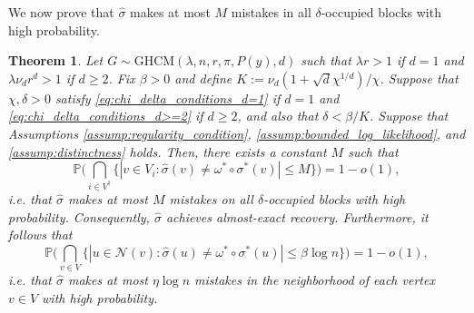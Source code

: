 \documentclass{article}
\renewcommand{\P}{\mathbb{P}}
\newcommand{\1}{\mathbbm{1}}
\newcommand{\calN}{\mathcal{N}}
\theoremstyle{definition}
\theoremstyle{plain}
\newtheorem{theorem}{Theorem}
\begin{document}
We now prove that $\hat{\sigma}$ makes at most $M$ mistakes in all $\delta$-occupied blocks with high probability.

\begin{theorem}
\label{thm:almost_exact_recovery}
Let $G \sim \text{GHCM}(\lambda, n, r, \pi, P(y), d)$ such that $\lambda r > 1$ if $d = 1$ and $\lambda \nu_d r^d > 1$ if $d \geq 2$. Fix $\beta > 0$ and define $K := \nu_d(1 + \sqrt{d}\chi^{1/d})/\chi$. Suppose that $\chi, \delta > 0$ satisfy \eqref{eq:chi_delta_conditions_d=1} if $d = 1$ and \eqref{eq:chi_delta_conditions_d>=2} if $d \geq 2$, and also that $\delta < \beta / K$. Suppose that Assumptions \ref{assump:regularity_condition}, \ref{assump:bounded_log_likelihood}, and \ref{assump:distinctness} holds. Then, there exists a constant $M$ such that
\begin{equation}
\label{eq:errors_within_block}
    \P\bigg( \bigcap_{i \in V^\dagger} \Big\{ |v \in V_i: \hat{\sigma}(v) \neq \omega^* \circ \sigma^*(v) | \leq M \Big\} \bigg) = 1 - o(1),
\end{equation}
i.e. that $\hat{\sigma}$ makes at most $M$ mistakes on all $\delta$-occupied blocks with high probability. Consequently, $\hat{\sigma}$ achieves almost-exact recovery. Furthermore, it follows that
\begin{equation}
\label{eq:errors_within_neighborhood}
    \P\bigg( \bigcap_{v \in V} \{|u \in \calN(v): \hat{\sigma}(u) \neq \omega^* \circ \sigma^*(u)| \leq \beta \log n\} \bigg) = 1 - o(1),
\end{equation}
i.e. that $\hat{\sigma}$ makes at most $\eta \log n$ mistakes in the neighborhood of each vertex $v \in V$ with high probability.
\end{theorem}
\end{document}
